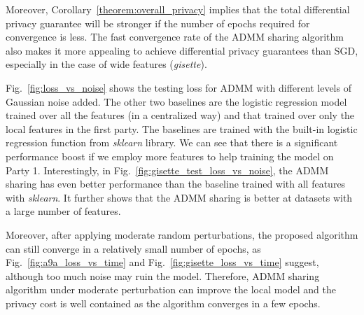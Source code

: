 Moreover, Corollary~\ref{theorem:overall_privacy} implies that the total differential privacy guarantee will be stronger if the number of epochs required for convergence is less. The fast convergence rate of the ADMM sharing algorithm also makes it more appealing to achieve differential privacy guarantees than SGD, especially in the case of wide features (\emph{gisette}).

Fig.~\ref{fig:loss_vs_noise} shows the testing loss for ADMM with different levels of Gaussian noise added. The other two baselines are the logistic regression model trained over all the features (in a centralized way) and that trained over only the local features in the first party. The baselines are trained with the built-in logistic regression function from \emph{sklearn} library. We can see that there is a significant performance boost if we employ more features to help training the model on Party 1. Interestingly, in Fig.~\ref{fig:gisette_test_loss_vs_noise}, the ADMM sharing has even better performance than the baseline trained with all features with \emph{sklearn}. It further shows that the ADMM sharing is better at datasets with a large number of features. 

Moreover, after applying moderate random perturbations, the proposed algorithm can still converge in a relatively small number of epochs, as Fig.~\ref{fig:a9a_loss_vs_time} and Fig.~\ref{fig:gisette_loss_vs_time} suggest, although too much noise may ruin the model.
Therefore, ADMM sharing algorithm under moderate perturbation can improve the local model and the privacy cost is well contained as the algorithm converges in a few epochs.


